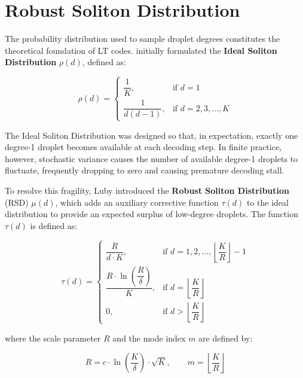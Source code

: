 \section{Robust Soliton Distribution}
\label{sec:robust_soliton_distribution}

The probability distribution used to sample droplet degrees constitutes the theoretical foundation of LT codes.  initially formulated the \textbf{Ideal Soliton Distribution} $\rho(d)$, defined as:

\begin{equation}
    \label{eq:ideal_soliton}
    \rho(d) = \begin{cases}
        \dfrac{1}{K}, & \text{if } d = 1 \\[10pt]
        \dfrac{1}{d(d-1)}, & \text{if } d = 2, 3, \ldots, K
    \end{cases}
\end{equation}

The Ideal Soliton Distribution was designed so that, in expectation, exactly one degree-1 droplet becomes available at each decoding step. In finite practice, however, stochastic variance causes the number of available degree-1 droplets to fluctuate, frequently dropping to zero and causing premature decoding stall.

To resolve this fragility, Luby introduced the \textbf{Robust Soliton Distribution} (RSD) $\mu(d)$, which adds an auxiliary corrective function $\tau(d)$ to the ideal distribution to provide an expected surplus of low-degree droplets. The function $\tau(d)$ is defined as:

\begin{equation}
    \label{eq:tau}
    \tau(d) = \begin{cases}
        \dfrac{R}{d \cdot K}, & \text{if } d = 1, 2, \ldots, \left\lfloor\dfrac{K}{R}\right\rfloor - 1 \\[10pt]
        \dfrac{R \cdot \ln\!\left(\dfrac{R}{\delta}\right)}{K}, & \text{if } d = \left\lfloor\dfrac{K}{R}\right\rfloor \\[10pt]
        0, & \text{if } d > \left\lfloor\dfrac{K}{R}\right\rfloor
    \end{cases}
\end{equation}

where the scale parameter $R$ and the mode index $m$ are defined by:

\begin{equation}
    \label{eq:R}
    R = c \cdot \ln\!\left(\frac{K}{\delta}\right) \cdot \sqrt{K}, \qquad m = \left\lfloor\frac{K}{R}\right\rfloor
\end{equation}

